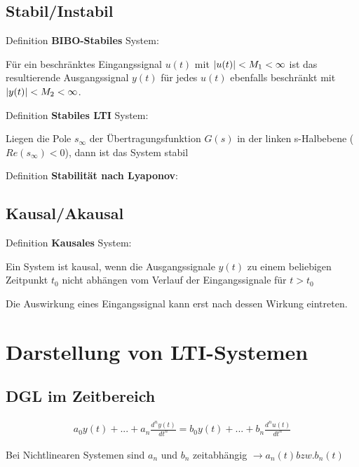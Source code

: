 \documentclass[10pt,a4paper]{article}
\begin{document}
  \subsection{Stabil/Instabil}
  Definition \textbf{BIBO-Stabiles} System:
  \begin{mdframed}[style=exercise]
      Für ein beschränktes Eingangssignal $u(t)$ mit $\abs{u(t)} < M_1 < \infty$ 
      ist das resultierende Ausgangssignal $y(t)$ für jedes $u(t)$ ebenfalls beschränkt mit $\abs{y(t)} < M_2 < \infty$.
  \end{mdframed}
  Definition \textbf{Stabiles LTI} System:
  \begin{mdframed}[style=exercise]
      Liegen die Pole $s_\infty$ der Übertragungsfunktion $G(s)$ in der linken s-Halbebene ($Re(s_\infty) < 0$), 
      dann ist das System stabil
  \end{mdframed}
  Definition \textbf{Stabilität nach Lyaponov}:
  

  \subsection{Kausal/Akausal}
  Definition \textbf{Kausales} System:
  \begin{mdframed}[style=exercise]
      Ein System ist kausal, wenn die Ausgangssignale $y(t)$ zu einem beliebigen Zeitpunkt $t_0$ nicht abhängen vom 
      Verlauf der Eingangssignale für $t>t_0$
  \end{mdframed}
  Die Auswirkung eines Eingangssignal kann erst nach dessen Wirkung eintreten.


\section{Darstellung von LTI-Systemen}

  \subsection{DGL im Zeitbereich}
  \begin{mdframed}[style=exercise]
    \begin{align}
        a_0y(t)+ ... + a_n \frac{d^n y(t)}{dt^n} = b_0y(t)+ ... + b_n\frac{d^n u(t)}{dt^n}
    \end{align}
  \end{mdframed}
  Bei Nichtlinearen Systemen sind $a_n$ und $b_n$ zeitabhängig $\rightarrow a_n(t) bzw. b_n(t) $
\end{document}
